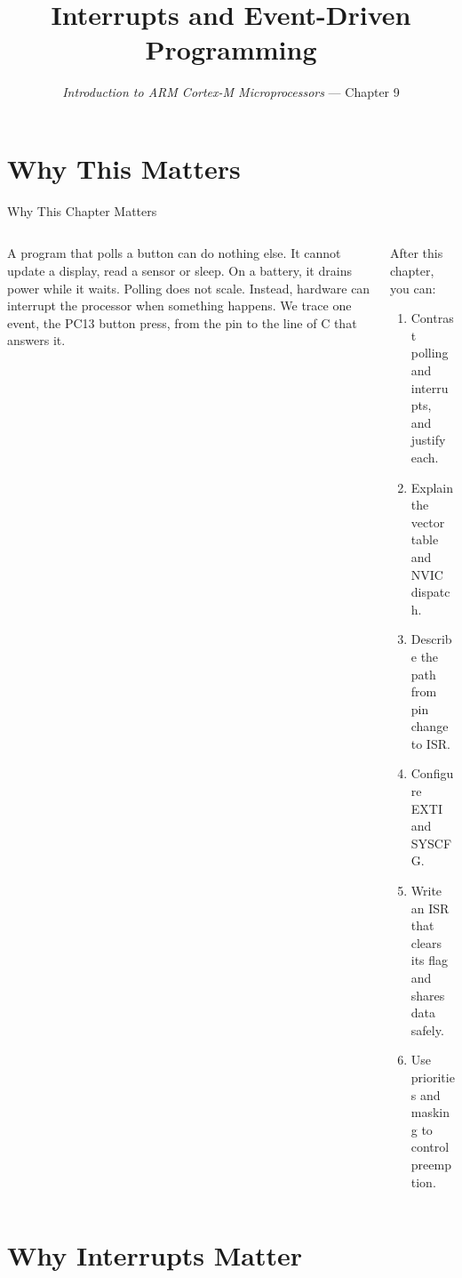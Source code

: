 \documentclass[9pt,aspectratio=169,xcolor=table]{beamer}
\title{Interrupts and Event-Driven Programming}
\subtitle{\emph{Introduction to ARM Cortex-M Microprocessors} --- Chapter 9}
\begin{document}
\titlepage

\section{Why This Matters}

\begin{frame}{Why This Chapter Matters}
    \begin{columns}[T]
    \begin{column}{.47\textwidth}
        {\normalsize A program that polls a button can do nothing else. It cannot update a display, read a sensor or sleep. On a battery, it drains power while it waits. Polling does not scale. Instead, hardware can interrupt the processor when something happens. We trace one event, the PC13 button press, from the pin to the line of C that answers it.}
    \end{column}
    \begin{column}{.51\textwidth}
        \begin{block}{After this chapter, you can:}
        {\small
        \begin{enumerate}\itemsep2pt
            \item Contrast polling and interrupts, and justify each.
            \item Explain the vector table and NVIC dispatch.
            \item Describe the path from pin change to ISR.
            \item Configure EXTI and SYSCFG.
            \item Write an ISR that clears its flag and shares data safely.
            \item Use priorities and masking to control preemption.
        \end{enumerate}}
        \end{block}
    \end{column}
    \end{columns}
\end{frame}


\section{Why Interrupts Matter}
\end{document}
